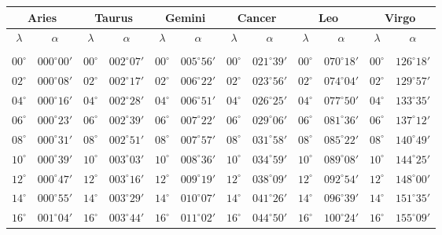 \clearpage
\begin{table}[!h]
\vspace{0.25cm}
\centering
{\scriptsize\begin{tabular}{cc|cc|cc|cc|cc|cc}
\multicolumn{2}{c}{Aries}\vline & \multicolumn{2}{c}{Taurus} \vline& \multicolumn{2}{c}{Gemini} \vline& \multicolumn{2}{c}{Cancer}\vline &
\multicolumn{2}{c}{Leo}\vline & \multicolumn{2}{c}{Virgo}\\\hline
$\lambda$& $\alpha$& $\lambda$& $\alpha$& $\lambda$& $\alpha$& $\lambda$& $\alpha$& $\lambda$& $\alpha$& $\lambda$& $\alpha$\\\hline
&&&&&&&&&&&\\[-2ex]
$00^\circ$ & $000^\circ00'$ & $00^\circ$ & $002^\circ07'$ & $00^\circ$ & $005^\circ56'$ & $00^\circ$ & $021^\circ39'$ & $00^\circ$ & $070^\circ18'$ & $00^\circ$ & $126^\circ18'$\\
$02^\circ$ & $000^\circ08'$ & $02^\circ$ & $002^\circ17'$ & $02^\circ$ & $006^\circ22'$ & $02^\circ$ & $023^\circ56'$ & $02^\circ$ & $074^\circ04'$ & $02^\circ$ & $129^\circ57'$\\
$04^\circ$ & $000^\circ16'$ & $04^\circ$ & $002^\circ28'$ & $04^\circ$ & $006^\circ51'$ & $04^\circ$ & $026^\circ25'$ & $04^\circ$ & $077^\circ50'$ & $04^\circ$ & $133^\circ35'$\\
$06^\circ$ & $000^\circ23'$ & $06^\circ$ & $002^\circ39'$ & $06^\circ$ & $007^\circ22'$ & $06^\circ$ & $029^\circ06'$ & $06^\circ$ & $081^\circ36'$ & $06^\circ$ & $137^\circ12'$\\
$08^\circ$ & $000^\circ31'$ & $08^\circ$ & $002^\circ51'$ & $08^\circ$ & $007^\circ57'$ & $08^\circ$ & $031^\circ58'$ & $08^\circ$ & $085^\circ22'$ & $08^\circ$ & $140^\circ49'$\\
$10^\circ$ & $000^\circ39'$ & $10^\circ$ & $003^\circ03'$ & $10^\circ$ & $008^\circ36'$ & $10^\circ$ & $034^\circ59'$ & $10^\circ$ & $089^\circ08'$ & $10^\circ$ & $144^\circ25'$\\
$12^\circ$ & $000^\circ47'$ & $12^\circ$ & $003^\circ16'$ & $12^\circ$ & $009^\circ19'$ & $12^\circ$ & $038^\circ09'$ & $12^\circ$ & $092^\circ54'$ & $12^\circ$ & $148^\circ00'$\\
$14^\circ$ & $000^\circ55'$ & $14^\circ$ & $003^\circ29'$ & $14^\circ$ & $010^\circ07'$ & $14^\circ$ & $041^\circ26'$ & $14^\circ$ & $096^\circ39'$ & $14^\circ$ & $151^\circ35'$\\
$16^\circ$ & $001^\circ04'$ & $16^\circ$ & $003^\circ44'$ & $16^\circ$ & $011^\circ02'$ & $16^\circ$ & $044^\circ50'$ & $16^\circ$ & $100^\circ24'$ & $16^\circ$ & $155^\circ09'$\\

\end{tabular}}
\end{table}
